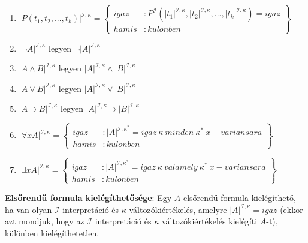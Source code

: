 \documentclass[margin=0px]{article}
\begin{document}
 	\begin{enumerate}
 		\item	$|P(t_{1}, t_{2}, ..., t_{k})|^{\mathcal{I},\kappa} = \left\{
		 		\begin{array}{lr}
		 		igaz & : P^{\mathcal{I}}(|t_{1}|^{\mathcal{I},\kappa}, |t_{2}|^{\mathcal{I},\kappa}, ..., |t_{k}|^{\mathcal{I},\kappa}) = igaz\\
		 		hamis & : kulonben
		 		\end{array}
	 		\right\}$
	 		
	 	\item	$|\neg A|^{\mathcal{I},\kappa}$ legyen $\neg |A|^{\mathcal{I},\kappa}$
	 	
	 	\item	$|A \wedge B|^{\mathcal{I},\kappa}$ legyen $|A|^{\mathcal{I},\kappa} \wedge |B|^{\mathcal{I},\kappa}$
	 	
	 	\item	$|A \vee B|^{\mathcal{I},\kappa}$ legyen $|A|^{\mathcal{I},\kappa} \vee |B|^{\mathcal{I},\kappa}$
	 	
	 	\item	$|A \supset B|^{\mathcal{I},\kappa}$ legyen $|A|^{\mathcal{I},\kappa} \supset |B|^{\mathcal{I},\kappa}$
	 	
	 	\item	$|\forall x A|^{\mathcal{I},\kappa} = \left\{
	 	\begin{array}{lr}
	 	igaz & : |A|^{\mathcal{I},\kappa^{*}} = igaz \ \kappa \ minden \ \kappa^{*} \ x-variansara \\
	 	hamis & : kulonben
	 	\end{array}
	 	\right\}$
	 	
	 	\item	$|\exists x A|^{\mathcal{I},\kappa} = \left\{
	 	\begin{array}{lr}
	 	igaz & : |A|^{\mathcal{I},\kappa^{*}} = igaz \ \kappa \ valamely \ \kappa^{*} \ x-variansara \\
	 	hamis & : kulonben
	 	\end{array}
	 	\right\}$
	 	
 	\end{enumerate}
	
	\noindent \textbf{Elsőrendű formula kielégíthetősége}: Egy $A$ elsőrendű formula kielégíthető, ha van
	olyan $\mathcal{I}$ interpretáció és $\kappa$ változókiértékelés, amelyre $|A|^{\mathcal{I},\kappa} = igaz$
	(ekkor azt mondjuk, hogy az $\mathcal{I}$ interpretáció és $\kappa$ változókiértékelés kielégíti $A$-t),
	különben kielégíthetetlen.
	
\end{document}
